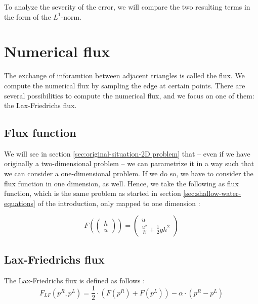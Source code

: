 \documentclass{article}
\begin{document}
To analyze the severity of the error, we will compare the two resulting terms in the form of the $L^1$-norm.

\section{Numerical flux}
\label{sec:numerical-flux}

The exchange of inforamtion between adjacent triangles is called the flux. We compute the numerical flux by sampling the edge at certain points. There are several possibilities to compute the numerical flux, and we focus on one of them: the Lax-Friedrichs flux.

\subsection{Flux function}
\label{sec:flux-function-intro}

We will see in section \ref{sec:original-situation-2D problem} that -- even if we have originally a two-dimensional problem -- we can parametrize it in a way such that we can consider a one-dimensional problem. If we do so, we have to consider the flux function in one dimension, as well. Hence, we take the following as flux function, which is the same problem as started in section \ref{sec:shallow-water-equations} of the introduction, only mapped to one dimension \cite{george2004numerical}:

\begin{equation}
  \label{eq:flux-function-definition}
  F\left(
    \begin{pmatrix}
      h \\ u
    \end{pmatrix}
  \right) =
  \begin{pmatrix}
    u \\
    \frac{u^2}{h} + \frac{1}{2} g h^2
  \end{pmatrix}
\end{equation}

\subsection{Lax-Friedrichs flux}
\label{sec:lax-friedrich-definition}

The Lax-Friedrichs flux is defined as follows \cite{leveque2002finite}:
\begin{equation}
  \label{eq:lax-friedrich-definition}
  F_{LF}(p^R,p^L) = \dfrac{1}{2}\cdot (F(p^R) + F(p^L)) - \alpha \cdot (p^R - p^L)
\end{equation}
\end{document}
